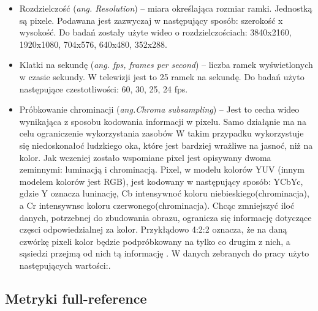 \begin{itemize}[label=$\bullet$]
\item Rozdzielczość ({\em ang.  Resolution}) -- miara określająca rozmiar ramki. Jednostką są pixele. Podawana jest zazwyczaj w następujący sposób: szerokość x wysokość. Do badań zostały użyte wideo o rozdzielczościach: 3840x2160, 1920x1080, 704x576, 640x480, 352x288. 
\item Klatki na sekundę ({\em ang. fps, frames per second}) -- liczba ramek wyświetlonych w czasie sekundy. W telewizji jest to 25 ramek na sekundę. Do badań użyto następujące czestotliwości: 60, 30, 25, 24 fps.
\item Próbkowanie chrominacji  ({\em ang.Chroma subsampling}) -- Jest to cecha  wideo wynikająca z sposobu kodowania  informacji w pixelu. Samo działąnie ma na celu  ograniczenie wykorzystania zasobów  W takim przypadku wykorzystuje się  niedoskonałoć ludzkiego oka, które jest bardziej wrażliwe na jasnoć, niż na kolor. Jak wczeniej zostało wspomiane pixel jest opisywany dwoma zeminnymi: luminacją i chrominacją.  Pixel, w modelu kolorów YUV (innym modelem kolorów jest RGB),  jest  kodowany w następujący sposób: YCbYc, gdzie Y oznacza luninację, Cb intensywnoć koloru niebieskiego(chrominacja), a Cr intensywnsc koloru czerwonego(chrominacja). Chcąc zmniejszyć iloć danych, potrzebnej do zbudowania obrazu, ogranicza się informację dotyczące częsci odpowiedzialnej za kolor. Przykłądowo 4:2:2 oznacza, że na daną czwórkę pixeli kolor będzie podpróbkowany na tylko co drugim z nich, a sąsiedzi przejmą od nich tą informację  \cite{chroma_sampling}. W danych zebranych do pracy użyto następujących wartości:.
\end{itemize}


\subsection{Metryki full-reference}

